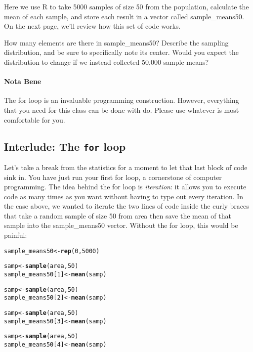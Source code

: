 \documentclass{article}\usepackage[]{graphicx}\usepackage[]{color}
\makeatletter
\newcommand{\hlnum}[1]{\textcolor[rgb]{0.686,0.059,0.569}{#1}}%
\newcommand{\hlstd}[1]{\textcolor[rgb]{0.345,0.345,0.345}{#1}}%
\newcommand{\hlkwb}[1]{\textcolor[rgb]{0.69,0.353,0.396}{#1}}%
\newcommand{\hlkwd}[1]{\textcolor[rgb]{0.737,0.353,0.396}{\textbf{#1}}}%
\newenvironment{kframe}{%
 \def\at@end@of@kframe{}%
 \ifinner\ifhmode%
  \def\at@end@of@kframe{\end{minipage}}%
  \begin{minipage}{\columnwidth}%
 \fi\fi%
 \def\FrameCommand##1{\hskip\@totalleftmargin \hskip-\fboxsep
 \colorbox{shadecolor}{##1}\hskip-\fboxsep
     \hskip-\linewidth \hskip-\@totalleftmargin \hskip\columnwidth}%
 \MakeFramed {\advance\hsize-\width
   \@totalleftmargin\z@ \linewidth\hsize
   \@setminipage}}%
 {\par\unskip\endMakeFramed%
 \at@end@of@kframe}
\newenvironment{knitrout}{}{} %
\makeatother
\begin{document}
Here we use R to take 5000 samples of size 50 from the population, calculate the mean of each sample, and store each result in a vector called \hlstd{sample\_means50}. On the next page, we'll review how this set of code works.

\begin{exercise}
How many elements are there in \hlstd{sample\_means50}?  Describe the sampling distribution, and be sure to specifically note its center.  Would you expect the distribution to change if we instead collected 50,000 sample means?
\end{exercise}

\paragraph{Nota Bene} The \hlnum{for} loop is an invaluable programming construction. However, everything that you need for this class can be done with \hlnum{do}. Please use whatever is most comfortable for you. 

\subsection*{Interlude: The \texttt{for} loop}
Let's take a break from the statistics for a moment to let that last block of code sink in.  You have just run your first for loop, a cornerstone of computer programming.  The idea behind the for loop is \emph{iteration}: it allows you to execute code as many times as you want without having to type out every iteration.  In the case above, we wanted to iterate the two lines of code inside the curly braces that take a random sample of size 50 from \hlstd{area} then save the mean of that sample into the \hlstd{sample\_means50} vector.  Without the for loop, this would be painful:

\begin{knitrout}
\color{fgcolor}\begin{kframe}
\begin{alltt}
\hlstd{sample_means50} \hlkwb{<-} \hlkwd{rep}\hlstd{(}\hlnum{0}\hlstd{,} \hlnum{5000}\hlstd{)}

\hlstd{samp} \hlkwb{<-} \hlkwd{sample}\hlstd{(area,} \hlnum{50}\hlstd{)}
\hlstd{sample_means50[}\hlnum{1}\hlstd{]} \hlkwb{<-} \hlkwd{mean}\hlstd{(samp)}

\hlstd{samp} \hlkwb{<-} \hlkwd{sample}\hlstd{(area,} \hlnum{50}\hlstd{)}
\hlstd{sample_means50[}\hlnum{2}\hlstd{]} \hlkwb{<-} \hlkwd{mean}\hlstd{(samp)}

\hlstd{samp} \hlkwb{<-} \hlkwd{sample}\hlstd{(area,} \hlnum{50}\hlstd{)}
\hlstd{sample_means50[}\hlnum{3}\hlstd{]} \hlkwb{<-} \hlkwd{mean}\hlstd{(samp)}

\hlstd{samp} \hlkwb{<-} \hlkwd{sample}\hlstd{(area,} \hlnum{50}\hlstd{)}
\hlstd{sample_means50[}\hlnum{4}\hlstd{]} \hlkwb{<-} \hlkwd{mean}\hlstd{(samp)}
\end{alltt}
\end{kframe}
\end{knitrout}
\end{document}

